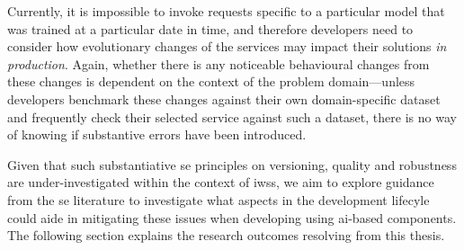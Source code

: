 Currently, it is impossible to invoke requests specific to a particular model that was trained at a particular date in time, and therefore developers need to consider how evolutionary changes of the services may impact their solutions \textit{in production}. Again, whether there is any noticeable behavioural changes from these changes is dependent on the context of the problem domain---unless developers benchmark these changes against their own domain-specific dataset and frequently check their selected service against such a dataset, there is no way of knowing if substantive errors have been introduced. 

Given that such substantiative \gls{se} principles on versioning, quality and robustness are under-investigated within the context of \glspl{iws}, we aim to explore guidance from the \gls{se} literature to investigate what aspects in the development lifecyle could aide in mitigating these issues when developing using \gls{ai}-based components. The following section explains the research outcomes resolving from this thesis.